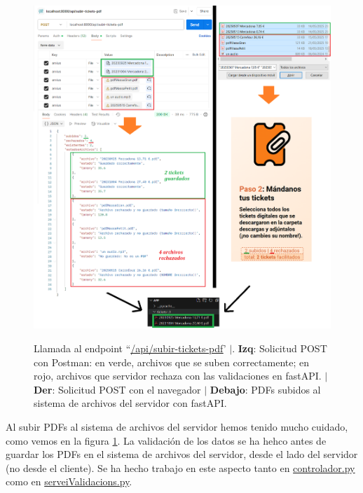 \documentclass[a4paper,12pt]{report}
\begin{document}
	
	\FloatBarrier
	\setlength{\belowcaptionskip}{3pt}
	\begin{figure}[H]
		\centering
		\caption{Llamada al endpoint ``\href{www.google.com}{/api/subir-tickets-pdf}' $|$.\textbf{ Izq}: Solicitud POST con Postman: en verde, archivos que se suben correctamente; en rojo, archivos que servidor rechaza con las validaciones en fastAPI. $|$ \textbf{Der}: Solicitud POST con el navegador $|$ \textbf{Debajo}: PDFs subidos al sistema de archivos del servidor con fastAPI.}
		\includegraphics[width=1\linewidth]{img/validacionsArxiusPujadaEndpointTickets} 
		\label{fig:validacionsArxiusPujadaEndpointTickets}
	\end{figure}
	\FloatBarrier
	
	
	Al subir PDFs al sistema de archivos del servidor hemos tenido mucho cuidado, como vemos en la figura \ref{fig:validacionsArxiusPujadaEndpointTickets}.
	La validación de los datos se ha hehco antes de guardar los PDFs en el sistema de archivos del servidor, desde el lado del servidor (no desde el cliente). Se ha hecho trabajo en este aspecto tanto en \href{https://github.com/blackcub3s/mercApp/blob/main/APP%20WEB/__FastAPI__/app/controlador.py}{controlador.py} como en \href{https://github.com/blackcub3s/mercApp/blob/main/APP%20WEB/__FastAPI__/app/serveiValidacions.py}{serveiValidacions.py}. 
	
\end{document}
